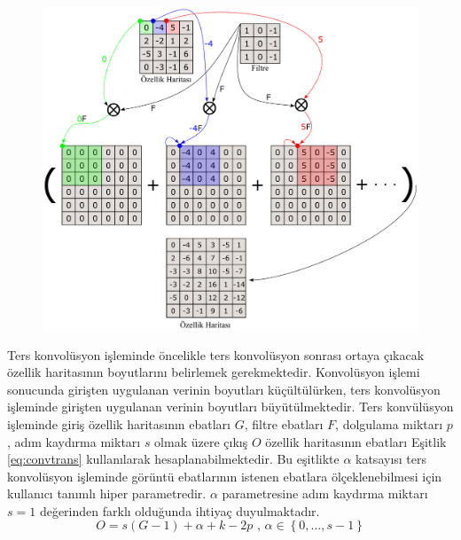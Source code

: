 \begin{figure}[h!]
	\begin{center}
		\vspace{0.4cm}
		{
			\vspace{0.4cm}
			\includegraphics[scale=0.28]{Yapilan-Calismalar/Figures/conv2Dtranspose1.pdf}
		}
	\end{center}
\end{figure}

Ters konvolüsyon işleminde öncelikle ters konvolüsyon sonrası ortaya çıkacak özellik haritasının boyutlarını belirlemek gerekmektedir. Konvolüsyon işlemi sonucunda girişten uygulanan verinin boyutları küçültülürken, ters konvolüsyon işleminde girişten uygulanan verinin boyutları büyütülmektedir. Ters konvülüsyon işleminde giriş özellik haritasının ebatları $G$, filtre ebatları $F$, dolgulama miktarı $p$, adım kaydırma miktarı $s$ olmak üzere çıkış $O$ özellik haritasının ebatları Eşitlik \ref{eq:convtrans} kullanılarak hesaplanabilmektedir. Bu eşitlikte $\alpha$ katsayısı ters konvolüsyon işleminde görüntü ebatlarının istenen ebatlara ölçeklenebilmesi için kullanıcı tanımlı hiper parametredir. $\alpha$ parametresine adım kaydırma miktarı $s=1$ değerinden farklı olduğunda ihtiyaç duyulmaktadır.
\begin{equation}
	\label{eq:convtrans}
	O=s(G-1)+\alpha+k-2p \text{ , } \alpha\in\left\{ 0,...,s-1 \right\}
\end{equation}

